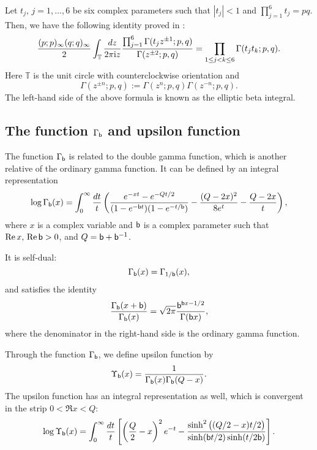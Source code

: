 Let $t_j$, $j=1,\ldots,6$ be six complex parameters such that $|t_j|<1$ and $\prod_{j=1}^6 t_j=pq$.
Then, we have the following identity proved in \cite{MR1846786}:
\begin{equation}
    \frac{(p;p)_{\infty} (q;q)_{\infty}}{2}
        \int_{\mathbb T}\frac{dz}{2\pi\mathrm{i} z} \frac{\prod_{j=1}^6\Gamma(t_j z^{\pm 1};p,q)}{\Gamma(z^{\pm 2};p,q)}
            =\prod_{1\leq j<k \leq 6} \Gamma(t_j t_k;p,q).
\end{equation}
Here ${\mathbb T}$ is the unit circle with counterclockwise orientation and
\begin{equation}
    \Gamma(z^{\pm n};p,q) := \Gamma(z^{n};p,q) \Gamma(z^{-n};p,q).
\end{equation}
The left-hand side of the above formula is known as the elliptic beta integral.





\subsection{The function $\Gamma_{\mathsf{b}}$ and upsilon function}

The function $\Gamma_{\mathsf{b}}$ is related to the double gamma function,
which is another relative of the ordinary gamma function.
It can be defined by an integral representation
\begin{equation}
    \log \Gamma_{\mathsf{b}}(x) =\int_0^{\infty}
        \frac{dt}{t}\left( \frac{e^{-xt}-e^{-Qt/2}}{(1-e^{-\mathsf{b} t})(1-e^{-t/\mathsf{b}})}
            -\frac{(Q-2x)^2}{8e^t} -\frac{Q-2x}{t} \right),
\end{equation}
where $x$ is a complex variable and $\mathsf{b}$ is a complex parameter such that $\mathop{\mathrm{Re}}\nolimits x,\,\mathop{\mathrm{Re}}\nolimits \mathsf{b} >0$,
and $Q=\mathsf{b} + \mathsf{b}^{-1}$.

It is self-dual:
\begin{equation}
    \Gamma_{\mathsf{b}}(x) = \Gamma_{1/\mathsf{b}}(x),
\end{equation}
and satisfies the identity
\begin{equation}
    \frac{\Gamma_{\mathsf{b}}(x+\mathsf{b})}{\Gamma_{\mathsf{b}}(x)}
        = \sqrt{2\pi} \frac{\mathsf{b}^{\mathsf{b} x-1/2}}{\Gamma(\mathsf{b} x)},
\end{equation}
where the denominator in the right-hand side is the ordinary gamma function.

Through the function $\Gamma_{\mathsf{b}}$, we define upsilon function by
\begin{equation}
    \Upsilon_{\mathsf{b}}(x) = \frac{1}{\Gamma_{\mathsf{b}}(x) \Gamma_{\mathsf{b}}(Q-x)}.
\end{equation}
The upsilon function has an integral representation as well, which is convergent in the
strip $0<\Re x<Q$:
\begin{equation}
    \log \Upsilon_{\mathsf{b}}(x) =\int_0^{\infty}
    \frac{dt}{t}\left[ \left( \frac{Q}{2} -x \right)^2 e^{-t}
        - \frac{\sinh^2\big((Q/2-x)t/2\big)}{\sinh(\mathsf{b} t/2)\sinh(t/2\mathsf{b})} \right].
\end{equation}

